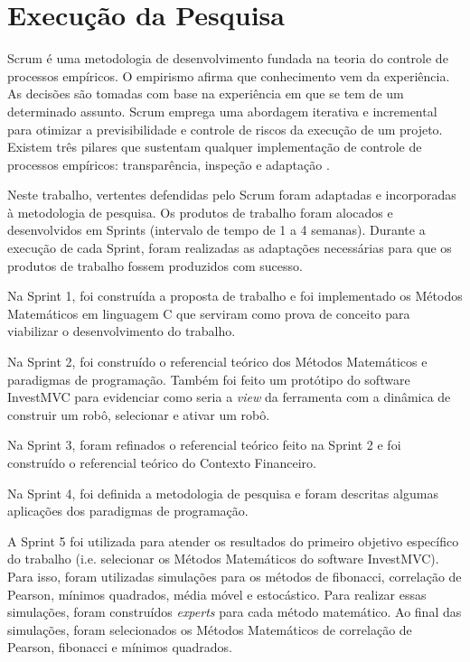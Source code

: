 \section{Execução da Pesquisa}

Scrum é uma metodologia de desenvolvimento fundada na teoria do controle de processos empíricos. O empirismo afirma que conhecimento vem da experiência. As decisões são tomadas com base na experiência em que se tem de um determinado assunto. Scrum emprega uma abordagem iterativa e incremental para otimizar a previsibilidade e controle de riscos da execução de um projeto. Existem três pilares que sustentam qualquer implementação de controle de processos empíricos: transparência, inspeção e adaptação \cite[pág.~4]{schwaber2013}.

Neste trabalho, vertentes defendidas pelo Scrum foram adaptadas e incorporadas à metodologia de pesquisa. Os produtos de  trabalho foram alocados e desenvolvidos em Sprints (intervalo de tempo de 1 a 4 semanas). Durante a execução de cada Sprint, foram realizadas as adaptações necessárias para que os produtos de trabalho fossem produzidos com sucesso.

Na Sprint 1, foi construída a proposta de trabalho e foi implementado os Métodos Matemáticos em linguagem C que serviram como prova de conceito para viabilizar o desenvolvimento do trabalho.

Na Sprint 2, foi construído o referencial teórico dos Métodos Matemáticos e paradigmas de programação. Também foi feito um protótipo do software InvestMVC para evidenciar como seria a \textit{view} da ferramenta com a dinâmica de construir um robô, selecionar e ativar um robô.

Na Sprint 3, foram refinados o referencial teórico feito na Sprint 2 e foi construído o referencial teórico do Contexto Financeiro.

Na Sprint 4, foi definida a metodologia de pesquisa e foram descritas algumas aplicações dos paradigmas de programação.

A Sprint 5 foi utilizada para atender os resultados do primeiro objetivo específico do trabalho (i.e. selecionar os Métodos Matemáticos do software InvestMVC). Para isso, foram utilizadas simulações para os métodos de fibonacci, correlação de Pearson, mínimos quadrados, média móvel e estocástico. Para realizar essas simulações, foram construídos \textit{experts} para cada método matemático. Ao final das simulações, foram selecionados os Métodos Matemáticos de correlação de Pearson, fibonacci e mínimos quadrados.

